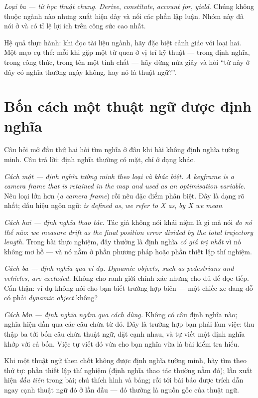 \documentclass[../../english.tex]{subfiles}
\begin{document}
\emph{Loại ba --- từ học thuật chung.} \emph{Derive}, \emph{constitute}, \emph{account for}, \emph{yield}. Chúng không thuộc ngành nào nhưng xuất hiện dày và nối các phần lập luận. Nhóm này đã nói ở  và có tỉ lệ lợi ích trên công sức cao nhất.

Hệ quả thực hành: khi đọc tài liệu ngành, hãy đặc biệt cảnh giác với loại hai. Một mẹo cụ thể: mỗi khi gặp một từ quen ở vị trí kỹ thuật --- trong định nghĩa, trong công thức, trong tên một tính chất --- hãy dừng nửa giây và hỏi ``từ này ở đây có nghĩa thường ngày không, hay nó là thuật ngữ?''.

\section{Bốn cách một thuật ngữ được định nghĩa}

Câu hỏi mở đầu thứ hai hỏi tìm nghĩa ở đâu khi bài không định nghĩa tường minh. Câu trả lời: định nghĩa thường có mặt, chỉ ở dạng khác.

\emph{Cách một --- định nghĩa tường minh theo loại và khác biệt.} \emph{A keyframe is a camera frame that is retained in the map and used as an optimisation variable.} Nêu loại lớn hơn (\emph{a camera frame}) rồi nêu đặc điểm phân biệt. Đây là dạng rõ nhất; dấu hiệu ngôn ngữ: \emph{is defined as}, \emph{we refer to X as}, \emph{by X we mean}.

\emph{Cách hai --- định nghĩa thao tác.} Tác giả không nói khái niệm là gì mà nói \emph{đo nó thế nào}: \emph{we measure drift as the final position error divided by the total trajectory length}. Trong bài thực nghiệm, đây thường là định nghĩa \emph{có giá trị nhất} vì nó không mơ hồ --- và nó nằm ở phần phương pháp hoặc phần thiết lập thí nghiệm.

\emph{Cách ba --- định nghĩa qua ví dụ.} \emph{Dynamic objects, such as pedestrians and vehicles, are excluded.} Không cho ranh giới chính xác nhưng cho đủ để đọc tiếp. Cẩn thận: ví dụ không nói cho bạn biết trường hợp biên --- một chiếc xe đang đỗ có phải \emph{dynamic object} không?

\emph{Cách bốn --- định nghĩa ngầm qua cách dùng.} Không có câu định nghĩa nào; nghĩa hiện dần qua các câu chứa từ đó. Đây là trường hợp bạn phải làm việc: thu thập ba tới bốn câu chứa thuật ngữ, đặt cạnh nhau, và tự viết một định nghĩa khớp với cả bốn. Việc tự viết đó vừa cho bạn nghĩa vừa là bài kiểm tra hiểu.

\begin{cannho}
Khi một thuật ngữ then chốt không được định nghĩa tường minh, hãy tìm theo thứ tự: phần thiết lập thí nghiệm (định nghĩa thao tác thường nằm đó); lần xuất hiện \emph{đầu tiên} trong bài; chú thích hình và bảng; rồi tới bài báo được trích dẫn ngay cạnh thuật ngữ đó ở lần đầu --- đó thường là nguồn gốc của thuật ngữ.
\end{cannho}
\end{document}
